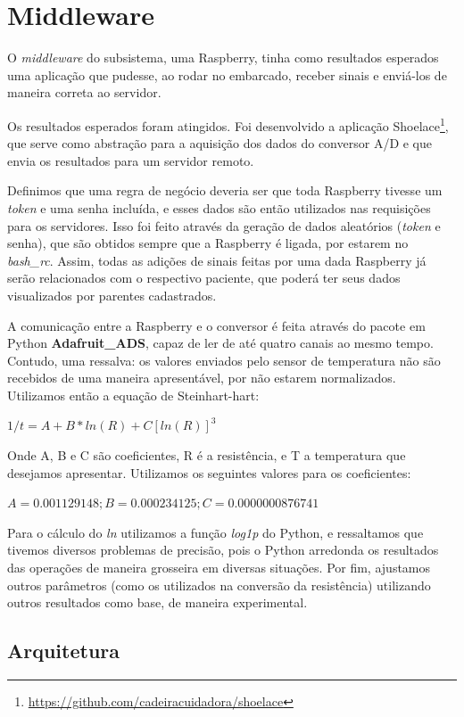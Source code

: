 \section{Middleware}

O \textit{middleware} do subsistema, uma Raspberry, tinha como resultados
esperados uma aplicação que pudesse, ao rodar no embarcado, receber sinais e
enviá-los de maneira correta ao servidor.

Os resultados esperados foram atingidos. Foi desenvolvido a aplicação
Shoelace\footnote{\url{https://github.com/cadeiracuidadora/shoelace}}, que
serve como abstração para a aquisição dos dados do conversor A/D e que envia
os resultados para um servidor remoto.

Definimos que uma regra de negócio deveria ser que toda Raspberry tivesse
um \textit{token} e uma senha incluída, e esses dados são então utilizados nas
requisições para os servidores. Isso foi feito através da geração de dados
aleatórios (\textit{token} e senha), que são obtidos sempre que a Raspberry
é ligada, por estarem no \textit{bash\_rc}. Assim, todas as adições de sinais
feitas por uma dada Raspberry já serão relacionados com o respectivo paciente,
que poderá ter seus dados visualizados por parentes cadastrados.

A comunicação entre a Raspberry e o conversor é feita através do pacote em
Python \textbf{Adafruit\_ADS}, capaz de ler de até quatro canais ao mesmo tempo.
Contudo, uma ressalva: os valores enviados pelo sensor de temperatura não são
recebidos de uma maneira apresentável, por não estarem normalizados. Utilizamos
então a equação de Steinhart-hart:

$ 1/t = A + B * ln(R) + C[ln(R)]^3 $

Onde A, B e C são coeficientes, R é a resistência, e T a temperatura que
desejamos apresentar. Utilizamos os seguintes valores para os coeficientes:

$ A = 0.001129148; B = 0.000234125 ; C =  0.0000000876741 $

Para o cálculo do \textit{ln} utilizamos a função \textit{log1p} do Python, e
ressaltamos que tivemos diversos problemas de precisão, pois o Python arredonda
os resultados das operações de maneira grosseira em diversas situações. Por
fim, ajustamos outros parâmetros (como os utilizados na conversão da
resistência) utilizando outros resultados como base, de maneira experimental.

\subsection{Arquitetura}

